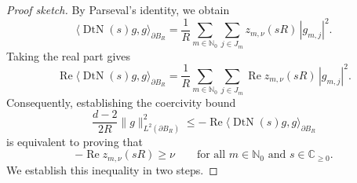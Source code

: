 \documentclass[12pt,reqno]{amsart}
\numberwithin{equation}{section}
\begin{document}
\begin{proof}[Proof sketch]
By Parseval's identity, we obtain
\begin{equation*}
    \langle \operatorname{DtN}(s)g, g \rangle_{\partial B_R}
    = \frac{1}{R} \sum_{m\in\mathbb{N}_0} \sum_{j\in J_m} z_{m,\nu}(sR) \, |g_{m,j}|^2.
\end{equation*}
Taking the real part gives
\begin{equation*}
    \operatorname{Re} \langle \operatorname{DtN}(s)g, g \rangle_{\partial B_R}
    = \frac{1}{R} \sum_{m\in\mathbb{N}_0} \sum_{j\in J_m} \operatorname{Re} z_{m,\nu}(sR) \, |g_{m,j}|^2.
\end{equation*}
Consequently, establishing the coercivity bound
\begin{equation}\label{eq43}
    \frac{d-2}{2R} \|g\|_{L^2(\partial B_R)}^2 \le - \operatorname{Re} \langle \operatorname{DtN}(s)g, g \rangle_{\partial B_R}
\end{equation}
is equivalent to proving that
\begin{equation*}
    - \operatorname{Re} z_{m,\nu}(sR) \ge \nu \qquad \text{for all } m \in \mathbb{N}_0 \text{ and } s \in \mathbb{C}_{\ge 0}.
\end{equation*}
We establish this inequality in two steps.


\end{proof}
\end{document}
